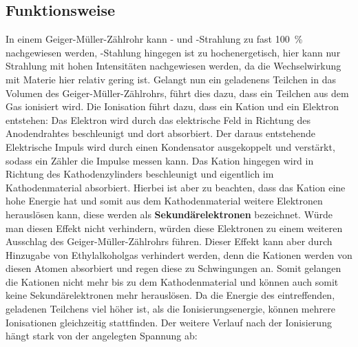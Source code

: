 \subsection{Funktionsweise}
In einem Geiger-Müller-Zählrohr kann \alpha- und \beta-Strahlung zu fast \SI{100}{\percent} nachgewiesen werden, \gamma-Stahlung hingegen ist zu hochenergetisch, hier kann nur
Strahlung mit hohen Intensitäten nachgewiesen werden, da die Wechselwirkung mit Materie hier relativ gering ist.
Gelangt nun ein geladenens Teilchen in das Volumen des Geiger-Müller-Zählrohrs, führt dies dazu, dass ein Teilchen aus dem Gas ionisiert wird. Die
Ionisation führt dazu, dass ein Kation und ein Elektron entstehen: Das Elektron wird durch das elektrische Feld in Richtung des Anodendrahtes beschleunigt
und dort absorbiert. Der daraus entstehende Elektrische Impuls wird durch einen Kondensator ausgekoppelt und verstärkt, sodass ein Zähler die Impulse messen kann.
Das Kation hingegen wird in Richtung des Kathodenzylinders beschleunigt und eigentlich im Kathodenmaterial absorbiert. Hierbei ist
aber zu beachten, dass das Kation eine hohe Energie hat und somit aus dem Kathodenmaterial weitere Elektronen herauslösen kann, diese werden
als \textbf{Sekundärelektronen} bezeichnet. Würde man diesen Effekt nicht verhindern, würden diese Elektronen zu einem weiteren Ausschlag des Geiger-Müller-Zählrohrs
führen. Dieser Effekt kann aber durch Hinzugabe von Ethylalkoholgas verhindert werden, denn die Kationen werden von diesen Atomen absorbiert und regen diese
zu Schwingungen an. Somit gelangen die Kationen nicht mehr bis zu dem Kathodenmaterial und können auch somit keine Sekundärelektronen mehr herauslösen.
Da die Energie des eintreffenden, geladenen Teilchens viel höher ist, als die Ionisierungsenergie, können mehrere Ionisationen gleichzeitig stattfinden.
Der weitere Verlauf nach der Ionisierung hängt stark von der angelegten Spannung ab:
